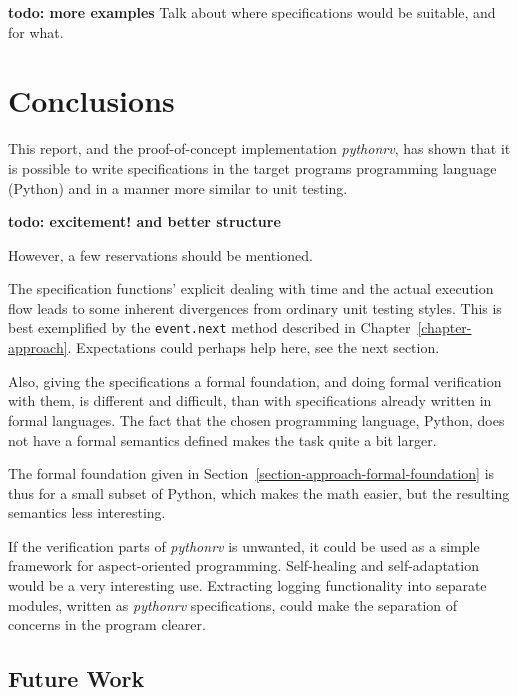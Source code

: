\documentclass[a4paper,11pt]{kth-mag}
\theoremstyle{definition}
\newcommand{\todo}[1]{\textbf{todo: #1}}
\begin{document}
\todo{more examples}
Talk about where specifications would be suitable, and for what.






\pagestyle{newchap}
\chapter{Conclusions} \label{chapter-conclusions}

This report, and the proof-of-concept implementation \textit{pythonrv}, has
shown that it is possible to write specifications in the target programs
programming language (Python) and in a manner more similar to unit testing.

\todo{excitement! and better structure}

However, a few reservations should be mentioned.

The specification functions' explicit dealing with time and the actual
execution flow leads to some inherent divergences from ordinary unit testing
styles. This is best exemplified by the \texttt{event.next} method described in
Chapter~\ref{chapter-approach}. Expectations could perhaps help here, see the
next section.

Also, giving the specifications a formal foundation, and doing formal
verification with them, is different and difficult, than with specifications
already written in formal languages. The fact that the chosen programming
language, Python, does not have a formal semantics defined makes the task quite
a bit larger.

The formal foundation given in Section~\ref{section-approach-formal-foundation}
is thus for a small subset of Python, which makes the math easier, but the
resulting semantics less interesting.

If the verification parts of \textit{pythonrv} is unwanted, it could be used as
a simple framework for aspect-oriented programming. Self-healing and
self-adaptation would be a very interesting use. Extracting logging
functionality into separate modules, written as \textit{pythonrv}
specifications, could make the separation of concerns in the program clearer.


\section{Future Work}
\end{document}
